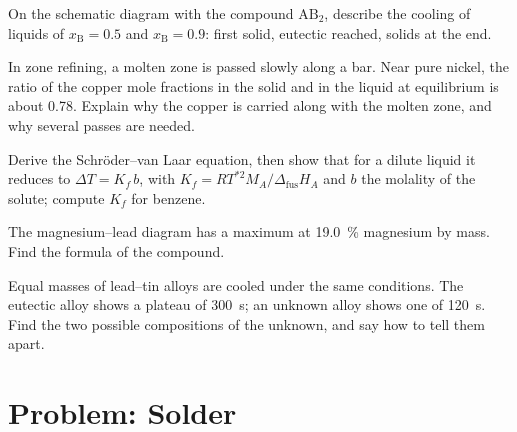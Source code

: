\begin{exercise}[$\star\star$]\label{exo:b2:solid-liquid-diagrams:8}
On the schematic diagram with the compound $\mathrm{AB_2}$, describe the
cooling of liquids of $x_{\mathrm B} = 0.5$ and $x_{\mathrm B} = 0.9$: first
solid, eutectic reached, solids at the end.
\end{exercise}

\begin{exercise}[$\star\star$]\label{exo:b2:solid-liquid-diagrams:9}
In zone refining, a molten zone is passed slowly along a bar. Near pure nickel,
the ratio of the copper mole fractions in the solid and in the liquid at
equilibrium is about 0.78. Explain why the copper is carried along with the
molten zone, and why several passes are needed.
\end{exercise}

\begin{exercise}[$\star\star\star$]\label{exo:b2:solid-liquid-diagrams:10}
Derive the Schröder--van Laar equation, then show that for a dilute liquid
it reduces to $\Delta T = K_f\,b$, with $K_f = RT^{*2}M_A/\Delta_{\text{fus}}H_A$
and $b$ the molality of the solute; compute $K_f$ for benzene.
\end{exercise}

\begin{exercise}[$\star\star\star$]\label{exo:b2:solid-liquid-diagrams:11}
The magnesium--lead diagram has a  maximum at 19.0~\% magnesium by
mass. Find the formula of the compound.
\end{exercise}

\begin{exercise}[$\star\star\star$]\label{exo:b2:solid-liquid-diagrams:12}
Equal masses of lead--tin alloys are cooled under the same conditions. The
eutectic alloy shows a plateau of \qty{300}{s}; an unknown alloy shows one of
\qty{120}{s}. Find the two possible compositions of the unknown, and say how to
tell them apart.
\end{exercise}

\section{Problem: Solder}

